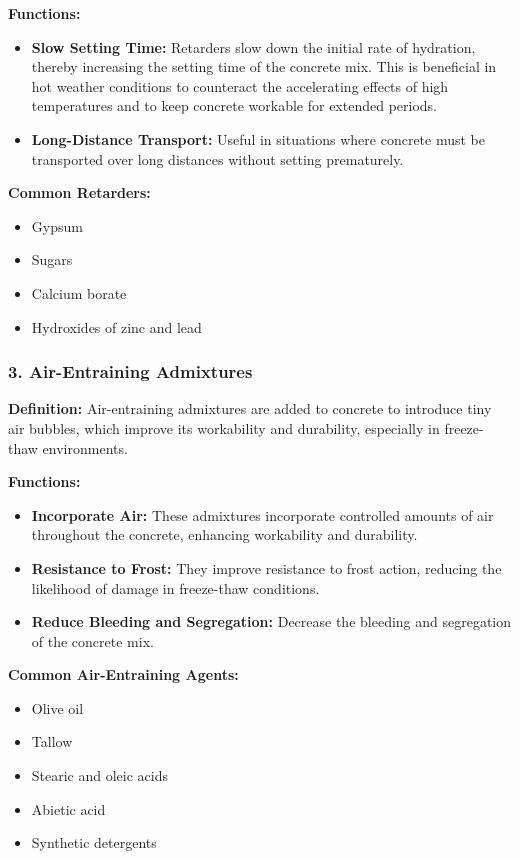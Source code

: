 \documentclass[a4paper,11pt]{book}
\begin{document}
\textbf{Functions:}
\begin{itemize}
    \item \textbf{Slow Setting Time:} Retarders slow down the initial rate of hydration, thereby increasing the setting time of the concrete mix. This is beneficial in hot weather conditions to counteract the accelerating effects of high temperatures and to keep concrete workable for extended periods.
    \item \textbf{Long-Distance Transport:} Useful in situations where concrete must be transported over long distances without setting prematurely.
\end{itemize}

\textbf{Common Retarders:}
\begin{itemize}
    \item Gypsum
    \item Sugars
    \item Calcium borate
    \item Hydroxides of zinc and lead
\end{itemize}

\subsubsection*{3. Air-Entraining Admixtures}
\textbf{Definition:} Air-entraining admixtures are added to concrete to introduce tiny air bubbles, which improve its workability and durability, especially in freeze-thaw environments.

\textbf{Functions:}
\begin{itemize}
    \item \textbf{Incorporate Air:} These admixtures incorporate controlled amounts of air throughout the concrete, enhancing workability and durability.
    \item \textbf{Resistance to Frost:} They improve resistance to frost action, reducing the likelihood of damage in freeze-thaw conditions.
    \item \textbf{Reduce Bleeding and Segregation:} Decrease the bleeding and segregation of the concrete mix.
\end{itemize}

\textbf{Common Air-Entraining Agents:}
\begin{itemize}
    \item Olive oil
    \item Tallow
    \item Stearic and oleic acids
    \item Abietic acid
    \item Synthetic detergents
\end{itemize}
\end{document}
